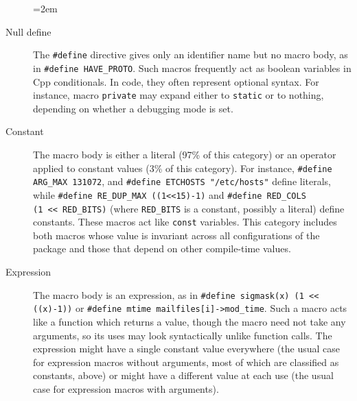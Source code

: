\documentclass[10pt]{article}
\begin{document}
\begin{description}
  \sloppy
  \emergencystretch=2em

\item[Null define]  The {\tt \#define} directive gives only an
  identifier name but no macro body, as in {\tt \#define
  \verb|HAVE_PROTO|}\@.  Such macros frequently act as boolean variables in
Cpp conditionals.  In code, they often represent optional syntax.  For
instance, macro {\tt private} may expand either to {\tt static} or to
nothing, depending on whether a debugging mode is set.

\item[Constant] The macro body is either a literal (97\% of this category)
  or an operator applied to constant values (3\% of this category).  For
  instance, {\tt \#define \verb|ARG_MAX| 131072}, and {\tt \#define
  ETCHOSTS "/etc/hosts"} define literals, while {\tt \#define
\verb|RE_DUP_MAX| ((1<<15)-1)} and {\tt \#define \verb|RED_COLS| (1~<<~\verb|RED_BITS|)} (where \verb|RED_BITS| is a constant, possibly a literal)
define constants.  These macros act like {\tt const} variables.  This
category includes both macros whose value is invariant across all
configurations of the package and those that depend on other compile-time
values.


\item[Expression]  The macro body is an expression, as in {\tt \#define
  sigmask(x) (1 << ((x)-1))} or {\tt \#define mtime mailfiles[i]->\verb|mod_time|}.
Such a macro acts like a function which returns a value, though the
macro need not take any arguments, so its uses may look syntactically
unlike function calls. 
The expression might have a single constant value everywhere (the usual
case for expression macros without arguments, most of which are classified
as constants, above) or might have a different value at each use (the usual
case for expression macros with arguments).


\end{description}
\end{document}
